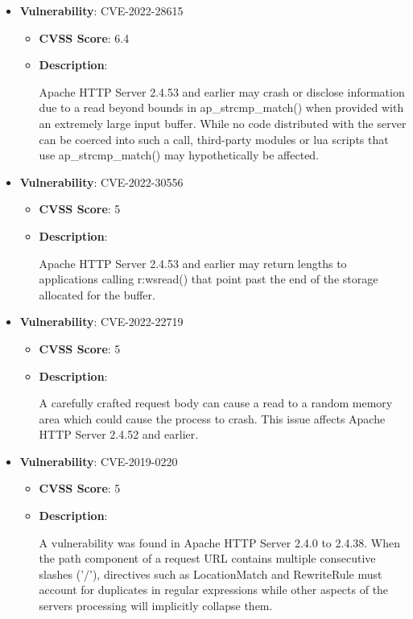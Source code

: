 \documentclass{article}
\begin{document}
\begin{itemize}
        \item \textbf{Vulnerability}: CVE-2022-28615
        \begin{itemize}
            \item \textbf{CVSS Score}:  6.4 
            \item \textbf{Description}:
            \parbox[t]{0.9\linewidth}{
                \ttfamily Apache HTTP Server 2.4.53 and earlier may crash or disclose information due to a read beyond bounds in ap\_strcmp\_match() when provided with an extremely large input buffer. While no code distributed with the server can be coerced into such a call, third-party modules or lua scripts that use ap\_strcmp\_match() may hypothetically be affected.
            }
        \end{itemize}
    
        \item \textbf{Vulnerability}: CVE-2022-30556
        \begin{itemize}
            \item \textbf{CVSS Score}:  5 
            \item \textbf{Description}:
            \parbox[t]{0.9\linewidth}{
                \ttfamily Apache HTTP Server 2.4.53 and earlier may return lengths to applications calling r:wsread() that point past the end of the storage allocated for the buffer.
            }
        \end{itemize}
    
        \item \textbf{Vulnerability}: CVE-2022-22719
        \begin{itemize}
            \item \textbf{CVSS Score}:  5 
            \item \textbf{Description}:
            \parbox[t]{0.9\linewidth}{
                \ttfamily A carefully crafted request body can cause a read to a random memory area which could cause the process to crash. This issue affects Apache HTTP Server 2.4.52 and earlier.
            }
        \end{itemize}
    
        \item \textbf{Vulnerability}: CVE-2019-0220
        \begin{itemize}
            \item \textbf{CVSS Score}:  5 
            \item \textbf{Description}:
            \parbox[t]{0.9\linewidth}{
                \ttfamily A vulnerability was found in Apache HTTP Server 2.4.0 to 2.4.38. When the path component of a request URL contains multiple consecutive slashes ('/'), directives such as LocationMatch and RewriteRule must account for duplicates in regular expressions while other aspects of the servers processing will implicitly collapse them.
            }
        \end{itemize}
    

\end{itemize}
\end{document}
